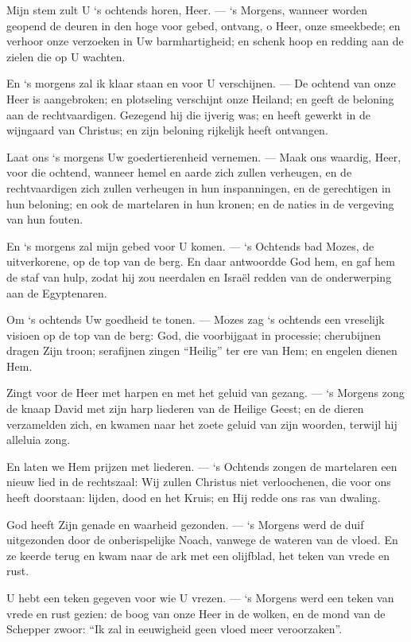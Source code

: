 \documentclass[12pt,twoside,a5paper]{article}
\begin{document}
\begin{halfparskip}
   Mijn stem zult U `s ochtends horen, Heer. --- `s Morgens, wanneer worden geopend de deuren in den hoge voor gebed, ontvang, o Heer, onze smeekbede; en verhoor onze verzoeken in Uw barmhartigheid; en schenk hoop en redding aan de zielen die op U wachten.

  En `s morgens zal ik klaar staan en voor U verschijnen. --- De ochtend van onze Heer is aangebroken; en plotseling verschijnt onze Heiland; en geeft de beloning aan de rechtvaardigen. Gezegend hij die ijverig was; en heeft gewerkt in de wijngaard van Christus; en zijn beloning rijkelijk heeft ontvangen.

  Laat ons `s morgens Uw goedertierenheid vernemen. --- Maak ons waardig, Heer, voor die ochtend, wanneer hemel en aarde zich zullen verheugen, en de rechtvaardigen zich zullen verheugen in hun inspanningen, en de gerechtigen in hun beloning; en ook de martelaren in hun kronen; en de naties in de vergeving van hun fouten.

  En `s morgens zal mijn gebed voor U komen. --- `s Ochtends bad Mozes, de uitverkorene, op de top van de berg. En daar antwoordde God hem, en gaf hem de staf van hulp, zodat hij zou neerdalen en Israël redden van de onderwerping aan de Egyptenaren.

  Om `s ochtends Uw goedheid te tonen. --- Mozes zag `s ochtends een vreselijk visioen op de top van de berg: God, die voorbijgaat in processie; cherubijnen dragen Zijn troon; serafijnen zingen ``Heilig'' ter ere van Hem; en engelen dienen Hem.

  Zingt voor de Heer met harpen en met het geluid van gezang. --- `s Morgens zong de knaap David met zijn harp liederen van de Heilige Geest; en de dieren verzamelden zich, en kwamen naar het zoete geluid van zijn woorden, terwijl hij alleluia zong.

  En laten we Hem prijzen met liederen. --- `s Ochtends zongen de martelaren een nieuw lied in de rechtszaal: Wij zullen Christus niet verloochenen, die voor ons heeft doorstaan: lijden, dood en het Kruis; en Hij redde ons ras van dwaling.

  God heeft Zijn genade en waarheid gezonden. --- `s Morgens werd de duif uitgezonden door de onberispelijke Noach, vanwege de wateren van de vloed. En ze keerde terug en kwam naar de ark met een olijfblad, het teken van vrede en rust.

  U hebt een teken gegeven voor wie U vrezen. --- `s Morgens werd een teken van vrede en rust gezien: de boog van onze Heer in de wolken, en de mond van de Schepper zwoor: ``Ik zal in eeuwigheid geen vloed meer veroorzaken''.


\end{halfparskip}
\end{document}
